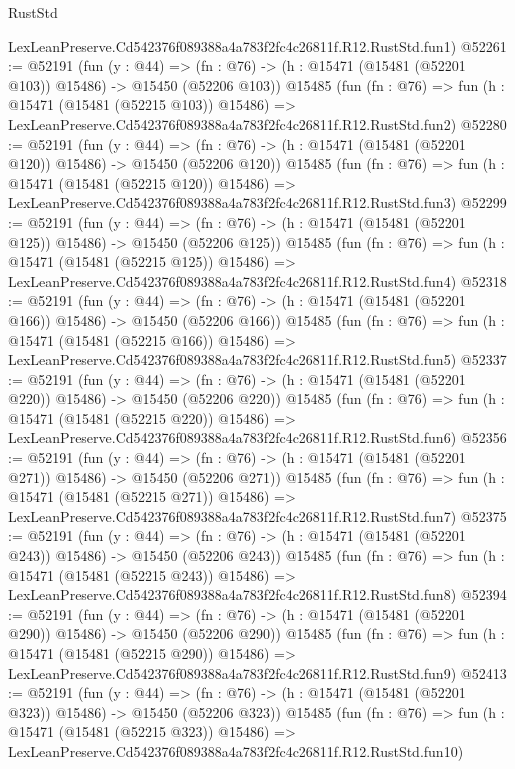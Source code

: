 \begin{lexlean}{RustStd}
\begin{coremodule}
    LexLeanPreserve.Cd542376f089388a4a783f2fc4c26811f.R12.RustStd.fun1)
@52261 := @52191
    (fun (y : @44) =>
    (fn : @76) -> (h : @15471 (@15481 (@52201 @103)) @15486) -> @15450 (@52206 @103))
    @15485
    (fun (fn : @76) =>
    fun (h : @15471 (@15481 (@52215 @103)) @15486) =>
    LexLeanPreserve.Cd542376f089388a4a783f2fc4c26811f.R12.RustStd.fun2)
@52280 := @52191
    (fun (y : @44) =>
    (fn : @76) -> (h : @15471 (@15481 (@52201 @120)) @15486) -> @15450 (@52206 @120))
    @15485
    (fun (fn : @76) =>
    fun (h : @15471 (@15481 (@52215 @120)) @15486) =>
    LexLeanPreserve.Cd542376f089388a4a783f2fc4c26811f.R12.RustStd.fun3)
@52299 := @52191
    (fun (y : @44) =>
    (fn : @76) -> (h : @15471 (@15481 (@52201 @125)) @15486) -> @15450 (@52206 @125))
    @15485
    (fun (fn : @76) =>
    fun (h : @15471 (@15481 (@52215 @125)) @15486) =>
    LexLeanPreserve.Cd542376f089388a4a783f2fc4c26811f.R12.RustStd.fun4)
@52318 := @52191
    (fun (y : @44) =>
    (fn : @76) -> (h : @15471 (@15481 (@52201 @166)) @15486) -> @15450 (@52206 @166))
    @15485
    (fun (fn : @76) =>
    fun (h : @15471 (@15481 (@52215 @166)) @15486) =>
    LexLeanPreserve.Cd542376f089388a4a783f2fc4c26811f.R12.RustStd.fun5)
@52337 := @52191
    (fun (y : @44) =>
    (fn : @76) -> (h : @15471 (@15481 (@52201 @220)) @15486) -> @15450 (@52206 @220))
    @15485
    (fun (fn : @76) =>
    fun (h : @15471 (@15481 (@52215 @220)) @15486) =>
    LexLeanPreserve.Cd542376f089388a4a783f2fc4c26811f.R12.RustStd.fun6)
@52356 := @52191
    (fun (y : @44) =>
    (fn : @76) -> (h : @15471 (@15481 (@52201 @271)) @15486) -> @15450 (@52206 @271))
    @15485
    (fun (fn : @76) =>
    fun (h : @15471 (@15481 (@52215 @271)) @15486) =>
    LexLeanPreserve.Cd542376f089388a4a783f2fc4c26811f.R12.RustStd.fun7)
@52375 := @52191
    (fun (y : @44) =>
    (fn : @76) -> (h : @15471 (@15481 (@52201 @243)) @15486) -> @15450 (@52206 @243))
    @15485
    (fun (fn : @76) =>
    fun (h : @15471 (@15481 (@52215 @243)) @15486) =>
    LexLeanPreserve.Cd542376f089388a4a783f2fc4c26811f.R12.RustStd.fun8)
@52394 := @52191
    (fun (y : @44) =>
    (fn : @76) -> (h : @15471 (@15481 (@52201 @290)) @15486) -> @15450 (@52206 @290))
    @15485
    (fun (fn : @76) =>
    fun (h : @15471 (@15481 (@52215 @290)) @15486) =>
    LexLeanPreserve.Cd542376f089388a4a783f2fc4c26811f.R12.RustStd.fun9)
@52413 := @52191
    (fun (y : @44) =>
    (fn : @76) -> (h : @15471 (@15481 (@52201 @323)) @15486) -> @15450 (@52206 @323))
    @15485
    (fun (fn : @76) =>
    fun (h : @15471 (@15481 (@52215 @323)) @15486) =>
    LexLeanPreserve.Cd542376f089388a4a783f2fc4c26811f.R12.RustStd.fun10)

\end{coremodule}
\end{lexlean}
